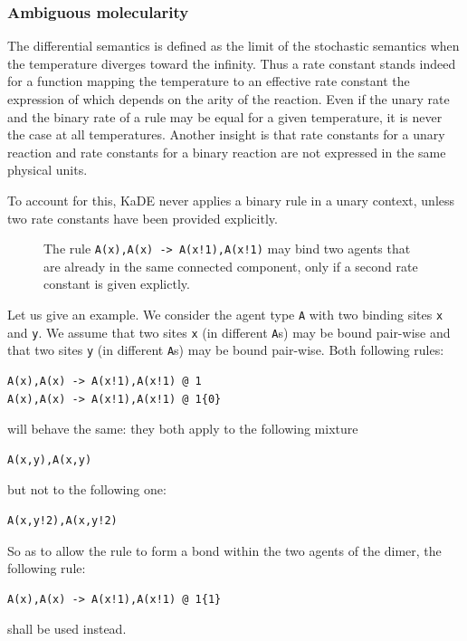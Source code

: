 \documentclass[11pt]{book}
\def\KaDE{\textsf{KaDE}}
\begin{document}
  \subsubsection{Ambiguous molecularity}

The differential semantics is defined as the limit of the stochastic semantics when the temperature diverges toward the infinity. Thus a rate constant stands indeed for a function mapping the temperature to an effective rate constant the expression of which depends on the arity of the reaction. Even if the unary rate and the binary rate of a rule may be equal for a given temperature, it is never the case at all temperatures. Another insight is that rate constants for a unary reaction and rate constants for a binary reaction are not expressed in the same physical units.

To account for this, {\KaDE} never applies a binary rule in a
  unary context, unless two rate constants have been provided explicitly.

\begin{figure}[t]
  \hfill\begin{minipage}{0.9\linewidth}
\end{minipage}\hfill\mbox{}
\caption{The rule \texttt{A(x),A(x) -> A(x!1),A(x!1)} may bind two agents that are already in the same connected component, only if a second rate constant is given explictly.}
\end{figure}
  Let us give an example. We consider the agent type \texttt{A} with two binding sites \texttt{x} and \texttt{y}. We assume that two sites \texttt{x} (in different \texttt{A}s) may be bound pair-wise and that two sites \texttt{y} (in different \texttt{A}s) may be bound pair-wise. Both following rules:
\begin{lstlisting}[language=kappa]
A(x),A(x) -> A(x!1),A(x!1) @ 1
A(x),A(x) -> A(x!1),A(x!1) @ 1{0}
\end{lstlisting}
  will behave the same: they both apply to the following mixture
\begin{lstlisting}[language=kappa]
A(x,y),A(x,y)
\end{lstlisting}
  but not to the following one:
\begin{lstlisting}[language=kappa]
A(x,y!2),A(x,y!2)
\end{lstlisting}

  So as to allow the rule to form a bond within the two agents of the dimer, the following rule:
  \begin{lstlisting}[language=kappa]
A(x),A(x) -> A(x!1),A(x!1) @ 1{1}
  \end{lstlisting}
   shall be used instead.
\end{document}
